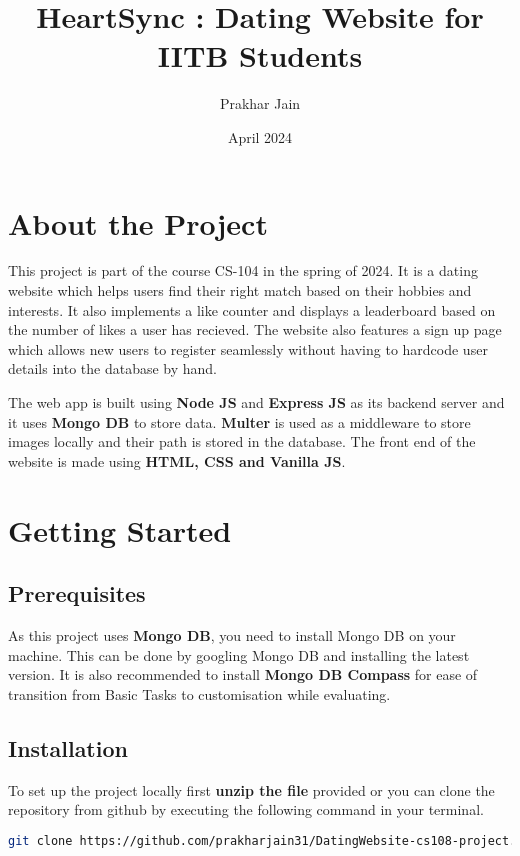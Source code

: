\documentclass{article}
\title{HeartSync : Dating Website for IITB Students}
\author{Prakhar Jain}
\date{April 2024}
\begin{document}
\maketitle
\tableofcontents
\clearpage
\section{About the Project}

 This project is part of the course CS-104 in the spring of 2024. It is a dating website which helps users find their right match based on their hobbies and interests. It also implements a like counter and displays a leaderboard based on the number of likes a user has recieved. The website also features a sign up page which allows new users to register seamlessly without having to hardcode user details into the database by hand.


The web app is built using \textbf{Node JS} and \textbf{Express JS} as its backend server and it uses \textbf{Mongo DB} to store data. \textbf{Multer} is used as a middleware to store images locally and their path is stored in the database. The front end of the website is made using \textbf{HTML, CSS and Vanilla JS}.
\section{Getting Started}

\subsection{Prerequisites}

As this project uses \textbf{Mongo DB}, you need to install Mongo DB on your machine. This can be done by googling Mongo DB and installing the latest version. It is also recommended to install \textbf{Mongo DB Compass} for ease of transition from Basic Tasks to customisation while evaluating.

\subsection{Installation}

To set up the project locally first \textbf{unzip the file} provided or you can clone the repository from github by executing the following command in your terminal.


\begin{lstlisting}[language=bash]
    git clone https://github.com/prakharjain31/DatingWebsite-cs108-project.git
\end{lstlisting}
\end{document}

